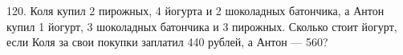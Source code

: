 120. Коля купил 2 пирожных, 4 йогурта и 2 шоколадных батончика, а Антон купил 1 йогурт, 3 шоколадных батончика и 3 пирожных. Сколько стоит йогурт, если Коля за свои покупки заплатил 440 рублей, а Антон --- 560?\\
